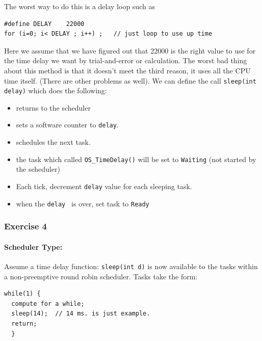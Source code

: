 \documentclass{article}	%
\begin{document}
The worst way to do this is a delay loop such as
\begin{verbatim}
#define DELAY    22000
for (i=0; i< DELAY ; i++) ;   // just loop to use up time
\end{verbatim}


Here we assume that we have figured out that 22000 is the right value to
use for the time delay we want by trial-and-error or calculation.   The
worst bad thing about this method is that it doesn't meet the third
reason, it uses all the CPU time itself.  (There are other problems as
well). We can define
the call {\tt sleep(int delay)} which does the following:
 

\begin{itemize}
        \item returns to the scheduler
        \item sets a software counter to {\tt delay}.  
        \item schedules the next task.
        \item the task which called {\tt OS\_TimeDelay()} will be set to 
         {\tt Waiting} (not started by the scheduler)
         \item Each tick, decrement {\tt delay} value for each sleeping task. 
        \item when the {\tt delay } is over, set task to {\tt Ready}
\end{itemize}


\subsubsection{Exercise 4}

\paragraph{Scheduler Type:} Assume a time delay function: {\tt sleep(int d)} is now available to the tasks 
within a non-preemptive round robin scheduler.  Tasks take the form:
\begin{verbatim}
while(1) {
  compute for a while;
  sleep(14);  // 14 ms. is just example.
  return;
  }
\end{verbatim} 
\end{document}
